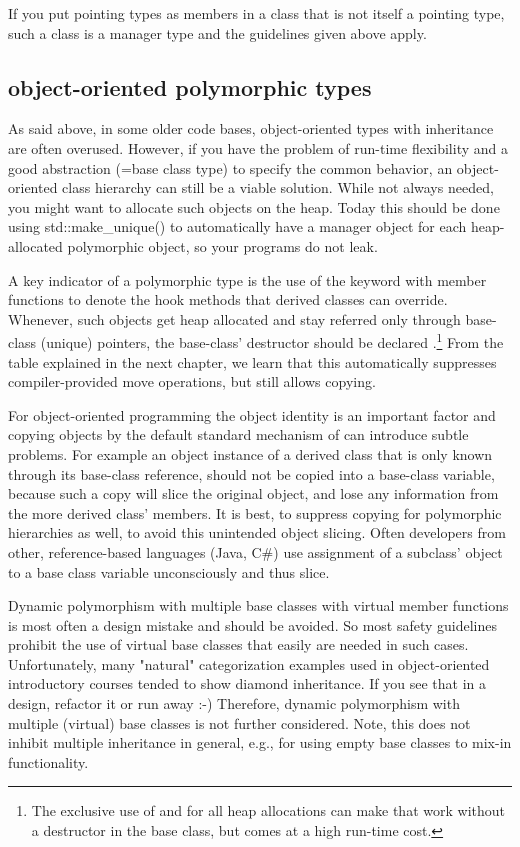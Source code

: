 \documentclass[ebook,11pt,article]{memoir}
\begin{document}
If you put pointing types as members in a class that is not itself a pointing type, such a class is a manager type and the guidelines given above apply.
 
\subsection{object-oriented polymorphic types}

As said above, in some older code bases, object-oriented types with inheritance are often overused. However, if you have the problem of run-time flexibility and a good abstraction (=base class type) to specify the common behavior, an object-oriented class hierarchy can still be a viable solution. While not always needed, you might want to allocate such objects on the heap. Today this should be done using std::make_unique() to automatically have a manager object for each heap-allocated polymorphic object, so your programs do not leak.

A key indicator of a polymorphic type is the use of the  keyword with member functions to denote the hook methods that derived classes can override. Whenever, such objects get heap allocated and stay referred only through base-class (unique) pointers, the base-class' destructor should be declared .\footnote{The exclusive use of  and  for all heap allocations can make that work without a  destructor in the base class, but comes at a high run-time cost.} From the table explained in the next chapter, we learn that this automatically suppresses compiler-provided move operations, but still allows copying. 

For object-oriented programming the object identity is an important factor and copying objects by the default standard mechanism of \Cpp{} can introduce subtle problems. For example an object instance of a derived class that is only known through its base-class reference, should not be copied into a base-class variable, because such a copy will slice the original object, and lose any information from the more derived class' members. It is best, to suppress copying for polymorphic hierarchies as well, to avoid this unintended object slicing. Often developers from other, reference-based languages (Java, C\#) use assignment of a subclass' object to a base class variable unconsciously and thus slice.

Dynamic polymorphism with multiple base classes with virtual member functions is most often a design mistake and should be avoided. So most safety guidelines prohibit the use of virtual base classes that easily are needed in such cases. Unfortunately, many "natural" categorization examples used in object-oriented introductory courses tended to show diamond inheritance. If you see that in a design, refactor it or run away :-) Therefore, dynamic polymorphism with multiple (virtual) base classes is not further considered. Note, this does not inhibit multiple inheritance in general, e.g., for using empty base classes to mix-in functionality.
\end{document}

